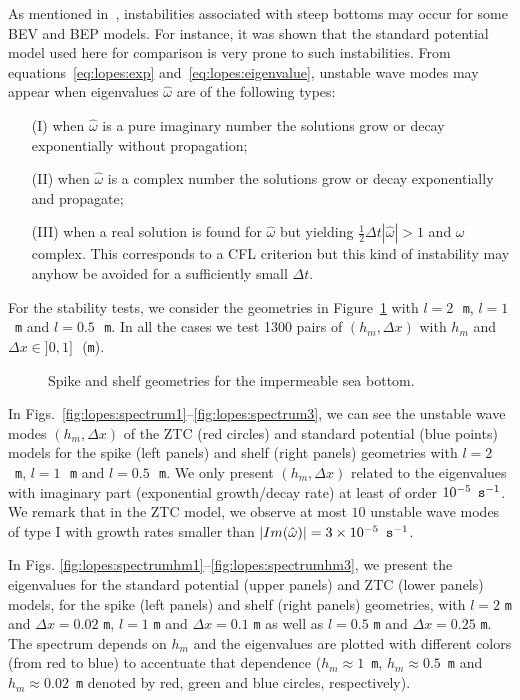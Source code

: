 As mentioned in~\citet{LovholtPedersen2009}, instabilities
 associated with steep bottoms may occur for some BEV and
 BEP models.  For instance, it was shown that the standard
 potential model used here for comparison is very prone to
 such instabilities.
From equations~\eqref{eq:lopes:exp}
and~\eqref{eq:lopes:eigenvalue},  unstable wave modes  may appear when
eigenvalues $\hat\omega$ are of the following types:
\begin{itemize}
\item[(I)] when $\hat\omega$ is a pure imaginary number the
solutions grow or decay exponentially without propagation;
\item[(II)] when $\hat\omega$ is a complex number the solutions grow
or decay exponentially and propagate;
\item[(III)] when a real solution is found for
$\hat\omega$ but  yielding $\frac{1}{2}\Delta t
|\hat\omega|>1$ and $\omega$ complex.
This corresponds to a CFL criterion but this kind
of instability may anyhow be avoided for a sufficiently
small $\Delta t$.
\end{itemize}

For the  stability tests, we consider the geometries
in Figure~\ref{fig:lopes:spikeshelf}
with  $l=2$\,~{\tt m}, $l=1$\,~{\tt m} and $l=0.5$\,~{\tt m}.
In all the cases we test  1300 pairs of
$(h_m,\Delta x)$ with $ h_m$ and $\Delta x\in ]0,1]$\,~({\tt m}).
\begin{figure}
{\small
\begin{center}
\end{center}
}
\caption{Spike and shelf geometries for the impermeable sea bottom.}
\label{fig:lopes:spikeshelf}
\end{figure}

In
Figs.~\ref{fig:lopes:spectrum1}--\ref{fig:lopes:spectrum3},
we can see the unstable wave modes $(h_m,\Delta x)$ of the ZTC
(red circles) and standard potential (blue points) models
for the spike (left panels) and shelf (right panels)
geometries with $l=2$\,~{\tt m}, $l=1$\,~{\tt m} and
$l=0.5$\,~{\tt m}.  We only present $(h_m,\Delta x)$ related
to the eigenvalues with imaginary part (exponential
growth/decay rate) at least of order $10^{-5}\,~{\tt
s}^{-1}$.  We remark that in the ZTC model, we
observe at most $10$ unstable wave modes of type I
with growth rates smaller than $|Im(\hat\omega)|=3\times
10^{-5}\,~{\tt s}^{-1}$.

In Figs. \ref{fig:lopes:spectrumhm1}--\ref{fig:lopes:spectrumhm3},
we present the eigenvalues for the standard potential
 (upper panels) and ZTC (lower panels)
 models, for the spike (left panels) and
 shelf (right panels) geometries, with  $l=2$ {\tt m} and
 $\Delta x=0.02$ {\tt m}, $l=1$ {\tt m} and
 $\Delta x=0.1$ {\tt m} as well as
$l=0.5$ {\tt m} and
 $\Delta x=0.25$ {\tt m}.
The  spectrum   depends  on $h_m$ and the eigenvalues are
plotted with different colors (from red to blue) to accentuate that
dependence ($h_m\approx 1$~{\tt m},
$h_m\approx 0.5$~{\tt m}
 and $h_m\approx 0.02$~{\tt m} denoted by red, green and
 blue circles, respectively).

